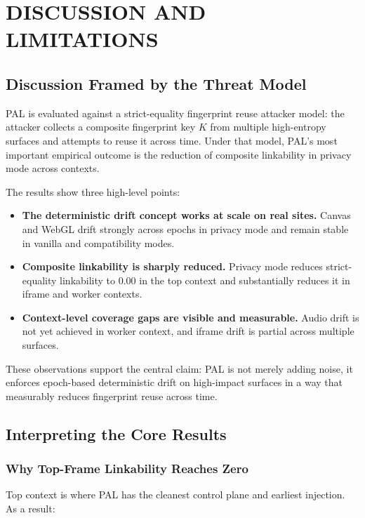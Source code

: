 \documentclass[11pt]{report}
\begin{document}
\chapter{DISCUSSION AND LIMITATIONS}

\section{Discussion Framed by the Threat Model}

PAL is evaluated against a strict-equality fingerprint reuse attacker model: the attacker collects a composite fingerprint key $K$ from multiple high-entropy surfaces and attempts to reuse it across time. Under that model, PAL’s most important empirical outcome is the reduction of composite linkability in privacy mode across contexts.

The results show three high-level points:

\begin{itemize}
    \item \textbf{The deterministic drift concept works at scale on real sites.} Canvas and WebGL drift strongly across epochs in privacy mode and remain stable in vanilla and compatibility modes.
    \item \textbf{Composite linkability is sharply reduced.} Privacy mode reduces strict-equality linkability to $0.00$ in the top context and substantially reduces it in iframe and worker contexts.
    \item \textbf{Context-level coverage gaps are visible and measurable.} Audio drift is not yet achieved in worker context, and iframe drift is partial across multiple surfaces.
\end{itemize}

These observations support the central claim: PAL is not merely adding noise, it enforces epoch-based deterministic drift on high-impact surfaces in a way that measurably reduces fingerprint reuse across time.

\section{Interpreting the Core Results}

\subsection{Why Top-Frame Linkability Reaches Zero}

Top context is where PAL has the cleanest control plane and earliest injection. As a result:
\end{document}

